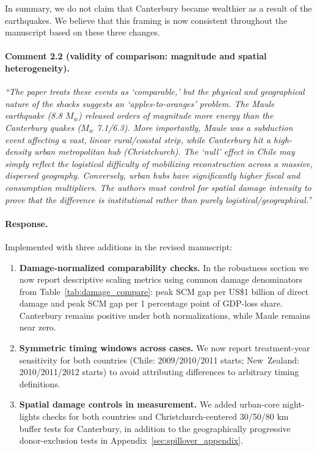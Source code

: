 In summary, we do not claim that Canterbury became wealthier as a result of the earthquakes. We believe that this framing is now consistent throughout the manuscript based on these three changes.

\paragraph{Comment 2.2 (validity of comparison: magnitude and spatial heterogeneity).}
\textit{``The paper treats these events as `comparable,' but the physical and geographical nature of the shocks suggests an `apples-to-oranges' problem. The Maule earthquake (8.8 $M_w$) released orders of magnitude more energy than the Canterbury quakes ($M_w$ 7.1/6.3). More importantly, Maule was a subduction event affecting a vast, linear rural/coastal strip, while Canterbury hit a high-density urban metropolitan hub (Christchurch). The `null' effect in Chile may simply reflect the logistical difficulty of mobilizing reconstruction across a massive, dispersed geography. Conversely, urban hubs have significantly higher fiscal and consumption multipliers. The authors must control for spatial damage intensity to prove that the difference is institutional rather than purely logistical/geographical.''}

\paragraph{Response.}
Implemented with three additions in the revised manuscript:
\begin{enumerate}
  \item \textbf{Damage-normalized comparability checks.} In the robustness section we now report descriptive scaling metrics using common damage denominators from Table~\ref{tab:damage_compare}: peak SCM gap per US\$1 billion of direct damage and peak SCM gap per 1 percentage point of GDP-loss share. Canterbury remains positive under both normalizations, while Maule remains near zero.
  \item \textbf{Symmetric timing windows across cases.} We now report treatment-year sensitivity for both countries (Chile: 2009/2010/2011 starts; New~Zealand: 2010/2011/2012 starts) to avoid attributing differences to arbitrary timing definitions.
  \item \textbf{Spatial damage controls in measurement.} We added urban-core night-lights checks for both countries and Christchurch-centered 30/50/80 km buffer tests for Canterbury, in addition to the geographically progressive donor-exclusion tests in Appendix~\ref{sec:spillover_appendix}.
\end{enumerate}


